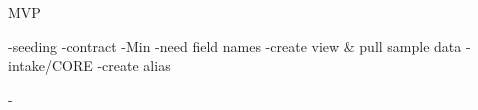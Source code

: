 MVP

-seeding
	-contract -Min
		-need field names
		-create view & pull sample data 
		-intake/CORE
		-create alias
		
	-
		